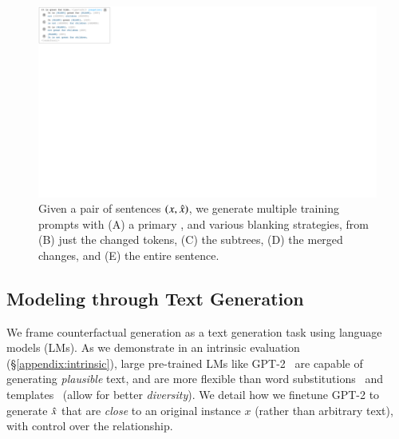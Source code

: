 \begin{figure}[t]
\centering
\includegraphics[trim={0 30.7cm 53.2cm 0cm}, clip, width=1\columnwidth]{figures/blank.pdf}
\vspace{-15pt}
\caption{Given a pair of sentences $(x, \hat{x})$, we generate multiple training prompts with (A) a primary \tagstr, and various blanking strategies, from (B) just the changed tokens, (C) the subtrees, (D) the merged changes, and (E) the entire sentence.
}
\vspace{-10pt}
\label{fig:blank}
\end{figure}

\subsection{Modeling through Text Generation}
\label{subsec:nlg}

We frame counterfactual generation as a text generation task using language models (LMs).
As we demonstrate in an intrinsic evaluation (\S\ref{appendix:intrinsic}), large pre-trained LMs like GPT-2~\cite{radford2019language} are capable of generating \emph{plausible} text, and are more flexible than word substitutions~\cite{garg2019counterfactual} and templates~\cite{ribeiro2018sear, wu2019errudite} (\ie allow for better \emph{diversity}). 
We detail how we finetune GPT-2 to generate $\hat{x}$ that are \emph{close} to an original instance $x$ (rather than arbitrary text), with control over the \relation{\xp} relationship.

